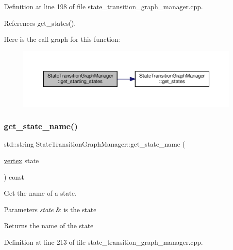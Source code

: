 Definition at line 198 of file state\+\_\+transition\+\_\+graph\+\_\+manager.\+cpp.



References get\+\_\+states().

Here is the call graph for this function\+:
\nopagebreak
\begin{figure}[H]
\begin{center}
\leavevmode
\includegraphics[width=350pt]{d9/dfd/classStateTransitionGraphManager_adf4d0d8cffd1c2055876aea1f74c45b8_cgraph}
\end{center}
\end{figure}
\mbox{\label{classStateTransitionGraphManager_a4cc1e1dafee9039389d7c273568d4e9a}} 
\subsubsection{\texorpdfstring{get\+\_\+state\+\_\+name()}{get\_state\_name()}}
{\footnotesize\ttfamily std\+::string State\+Transition\+Graph\+Manager\+::get\+\_\+state\+\_\+name (\begin{DoxyParamCaption}\item[{\hyperlink{graph_8hpp_abefdcf0544e601805af44eca032cca14}{vertex}}]{state }\end{DoxyParamCaption}) const}



Get the name of a state. 


\begin{DoxyParams}{Parameters}
{\em state} & is the state \\
\hline
\end{DoxyParams}
\begin{DoxyReturn}{Returns}
the name of the state 
\end{DoxyReturn}


Definition at line 213 of file state\+\_\+transition\+\_\+graph\+\_\+manager.\+cpp.



